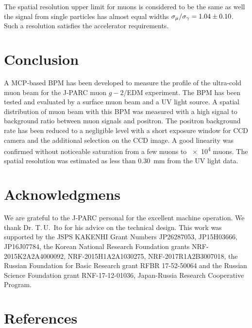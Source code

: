 \documentclass[preprint,3p,twocolumn]{elsarticle}
\begin{document}
The spatial resolution upper limit for muons is considered to be the same as well the signal from single particles has almost equal widths
$\sigma_{\mu} / \sigma_{\gamma} = \num{1.04 \pm 0.10}$.
Such a resolution satisfies the accelerator requirements.


\section{Conclusion}

A MCP-based BPM has been developed to measure the profile of  the ultra-cold muon beam 
for the J-PARC muon $g-2$/EDM experiment. 
The BPM has been tested and evaluated by a surface muon beam and a UV light source.
A spatial distribution of muon beam with this BPM was measured with
a high signal to background ratio between muon signals and positron.
The positron background rate has been reduced to a negligible level with 
a short exposure window for CCD camera and the additional selection on the CCD image.
A good linearity was confirmed without noticeable saturation from a few muons to \num{e4} muons.
The spatial resolution was estimated as less than \SI{.30}{\mm} from the UV light data.


\section*{Acknowledgmens}

We are grateful to the J-PARC personal for the excellent machine operation.
We thank Dr. T.\,U.~Ito for his advice on the technical design.
This work was supported by 
the JSPS KAKENHI Grant Numbers JP26287053, JP15H03666, JP16J07784,
the Korean National Research Foundation grants NRF-2015K2A2A4000092, NRF-2015H1A2A1030275, NRF-2017R1A2B3007018,
the Russian Foundation for Basic Research grant RFBR 17-52-50064 and
the Russian Science Foundation grant RNF-17-12-01036,
Japan-Russia Research Cooperative Program.

\section*{References}


\end{document}
